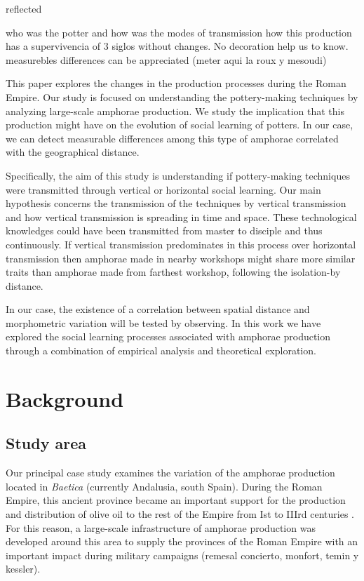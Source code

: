 \documentclass[review]{elsarticle}
\begin{document}
reflected                                 



who was the potter and how was the modes of  transmission how this production has a supervivencia of 3 siglos without changes. No decoration help us to know. measurebles differences can be appreciated (meter aqui la roux y mesoudi)




This paper explores the changes in the production processes during the Roman Empire. Our study is focused on understanding the pottery-making techniques by analyzing large-scale amphorae production. We study the implication that this production might have on the evolution of social learning of potters. In our case, we can detect measurable differences among this type of amphorae correlated with the geographical distance. 

Specifically, the aim of this study is understanding if pottery-making techniques were transmitted through vertical or horizontal social learning. Our main hypothesis concerns the transmission of the techniques by vertical transmission and how vertical transmission is spreading in time and space. These technological knowledges could have been transmitted from master to disciple and thus continuously. If vertical transmission predominates in this process over horizontal transmission then amphorae made in nearby workshops might share more similar traits than amphorae made from farthest workshop, following the isolation-by distance.    

In our case, the existence of a correlation between spatial distance and morphometric variation will be tested by observing. In this work we have explored the social learning processes associated with amphorae production through a combination of empirical analysis and theoretical exploration.



\section{Background}

\subsection{Study area}

Our principal case study examines the variation of the amphorae production located in \emph{Baetica} (currently Andalusia, south Spain). During the Roman Empire, this ancient province became an important support for the production and distribution of  olive oil to the rest of the Empire from Ist to IIIrd centuries \cite{rodriguez_baetican_1998}. For this reason, a large-scale infrastructure of amphorae production was developed around this area to supply the provinces of the Roman Empire with an important impact during military campaigns (remesal concierto, monfort, temin y kessler).
\end{document}

